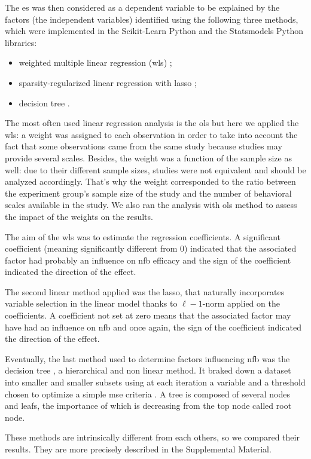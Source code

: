 The \gls{es} was then considered as a dependent variable to be explained by the factors (the independent variables) identified using the following three methods, which were 
implemented in the Scikit-Learn Python \citep[0.18.1]{Pedregosa2011} and the Statsmodels Python \citep[0.8.0]{Seabold2010} libraries:
\begin{itemize}
	\item weighted multiple linear regression (\gls{wls}) \citep{Montgomery2012}; 
	\item sparsity-regularized linear regression with \gls{lasso} \citep{Tibshirani1996};
	\item decision tree \citep{Quinlan1986}.
\end{itemize}

The most often used linear regression analysis is the \gls{ols} but here we applied the \gls{wls}: a 
weight was assigned to each observation in order to take into account the fact that some observations came from the same study because studies 
may provide several scales. Besides, the weight was a function of the sample size as well: due to their different sample sizes,
studies were not equivalent and should be analyzed accordingly. That's why the weight corresponded to the ratio between the experiment group's sample size of the study and 
the number of behavioral scales available in the study. We also ran the analysis with \gls{ols} method to assess the impact of the weights on the results. 

The aim of the \gls{wls} was to estimate the regression coefficients. A significant coefficient (meaning significantly different from 0) indicated 
that the associated factor had probably an influence on \gls{nfb} efficacy and the sign of the coefficient indicated the direction of the effect.

The second linear method applied was the \gls{lasso}, that naturally incorporates variable selection 
in the linear model thanks to $\ell-1$-norm applied on the coefficients. A coefficient not set at zero means that 
the associated factor may have had an influence on \gls{nfb} and once again, the sign of the coefficient indicated the direction of the effect.

Eventually, the last method used to determine factors influencing \gls{nfb} was the decision tree \citep{Quinlan1986}, a hierarchical and non linear method.
It braked down a dataset into smaller and smaller subsets using at each iteration a variable and a threshold chosen to optimize a simple \gls{mse} 
criteria \citep{James2013}. A tree is composed of several nodes and leafs, the importance of which is decreasing from the top node called root node. 

These methods are intrinsically different from each others, so we compared their results. They are more precisely described in the Supplemental Material.















